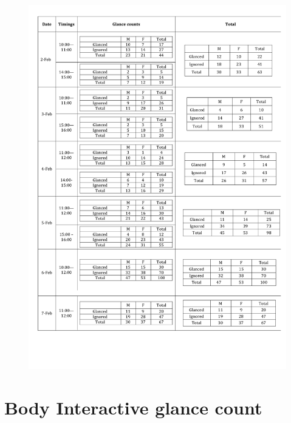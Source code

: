 \begin{appendices}
\begin{figure}[H]
 \centering 
    \includegraphics[width=\textwidth,height=0.8\textheight]{Appendices/8/non-interactive/non-interactive_glances.pdf}
     \label{app:non-interactive-glancecount}%
\end{figure}


\section{Body Interactive glance count}


\end{appendices}
